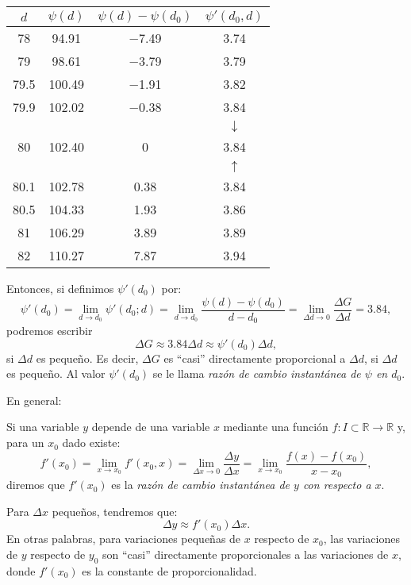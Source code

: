 \begin{center}
{\renewcommand\arraystretch{1.5}%
\setlength\extrarowheight{1pt}
\begin{tabular}{|c|c|c|c|}
\hline
$d$ & $\psi(d)$ & $\psi(d)-\psi(d_{0})$ & $\psi'(d_{0},d)$ \\
\hline
78  &  94.91 &  $-$7.49 & 3.74  \\[-2pt]
\hline
79 & 98.61 & $-$3.79 & 3.79 \\
\hline
79.5 &  100.49    & $-$1.91     &  3.82   \\
\hline
79.9 & 102.02     &  $-$0.38    &  3.84      \\
\hline
&  &  &  $\downarrow $\\
80 & 102.40 & 0 & 3.84  \\
&  &  &  $\uparrow $\\
\hline
80.1 &  102.78     &  0.38    &    3.84       \\
\hline
80.5 &  104.33    &   1.93     &   3.86      \\
\hline
81 & 106.29 & 3.89 & 3.89 \\
\hline
82 & 110.27 & 7.87 & 3.94 \\
\hline
\end{tabular}}
\end{center}

Entonces, si definimos $\psi'(d_0)$ por:
\[
\psi'(d_{0})=\lim_{d\rightarrow d_{0}}\psi'(d_{0};d) =
    \lim_{d\rightarrow d_{0}}\frac{\psi(d)-\psi(d_{0})}{d-d_{0}} =
    \lim_{\Delta d \rightarrow 0}\frac{\Delta G}{\Delta d} = 3.84,
\]
podremos escribir
\[
\Delta G \approx 3.84\Delta d \approx \psi'(d_{0}) \Delta d,
\]
si $\Delta d$ es pequeño. Es decir, $\Delta G$ es ``casi'' directamente proporcional a $\Delta d$,
si  $\Delta d$ es pequeño. Al valor $\psi'(d_{0})$ se le llama \emph{razón de cambio instantánea de
$\psi$ en $d_{0}$}.

En general:

\begin{defical}
Si una variable $y$ depende de una variable $x$ mediante una función $f\colon I\subset\mathbb{R}
\rightarrow \mathbb{R}$ y, para un $x_{0}$ dado existe:
\[
f'(x_{0}) = \lim_{x \rightarrow x_{0}}f'(x_{0},x) =
    \lim_{\Delta x \rightarrow 0}\frac{\Delta y}{\Delta x} =
    \lim_{x \rightarrow x_{0}}\frac{f(x)-f(x_{0})}{x-x_{0}},
\]
diremos que $f'(x_{0})$ es la \emph{razón de cambio instantánea de $y$ con respecto a $x$}.
\end{defical}

Para $\Delta x$ pequeños, tendremos que:
\[
\Delta y \approx f'(x_{0}) \Delta x.
\]
En otras palabras, para variaciones pequeñas de $x$ respecto de $x_0$, las variaciones de $y$
respecto de $y_0$ son ``casi'' directamente proporcionales a las variaciones de $x$, donde
$f'(x_{0})$ es la constante de proporcionalidad.

